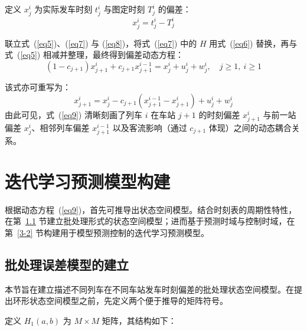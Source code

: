 定义 $x_{j}^{i}$ 为实际发车时刻 $t_j^i$ 与图定时刻 $T_{j}^{i}$ 的偏差：
\begin{equation}
    x_{j}^{i}=t_{j}^{i}-T_{j}^{i}  
\label{eq8}
\end{equation}

联立式~(\ref{eq5})、(\ref{eq7}) 与 (\ref{eq8})，将式~(\ref{eq7}) 中的 $H$ 用式~(\ref{eq6}) 替换，再与式~(\ref{eq5}) 相减并整理，最终得到偏差动态方程：
\begin{equation}
    (1-c_{j+1})x_{j+1}^{i}+c_{j+1}x_{j+1}^{i-1}=x_{j}^{i}+u_{j}^{i}+w_{j}^{i}, \quad j\geq1,\ i\geq1
\label{eq9}
\end{equation}

该式亦可重写为：
\begin{equation*}
	x_{j+1}^i = x_j^i - c_{j+1}\left(x_{j+1}^{i-1} - x_{j+1}^i\right) + u_j^i + w_j^i
\end{equation*}
由此可见，式~(\ref{eq9}) 清晰刻画了列车 $i$ 在车站 $j+1$ 的时刻偏差 $x_{j+1}^i$ 与前一站偏差 $x_j^i$、相邻列车偏差 $x_{j+1}^{i-1}$ 以及客流影响（通过 $c_{j+1}$ 体现）之间的动态耦合关系。

\section{迭代学习预测模型构建}
\label{section3}

根据动态方程~(\ref{eq9})，首先可推导出状态空间模型。结合时刻表的周期性特性，在第~\ref{3-1} 节建立批处理形式的状态空间模型；进而基于预测时域与控制时域，在第~\ref{3-2} 节构建用于模型预测控制的迭代学习预测模型。

\subsection{批处理误差模型的建立}
\label{3-1}

本节旨在建立描述不同列车在不同车站发车时刻偏差的批处理状态空间模型。在提出环形状态空间模型之前，先定义两个便于推导的矩阵符号。

定义 $H_{1}(a,b)$ 为 $M \times M$ 矩阵，其结构如下：


